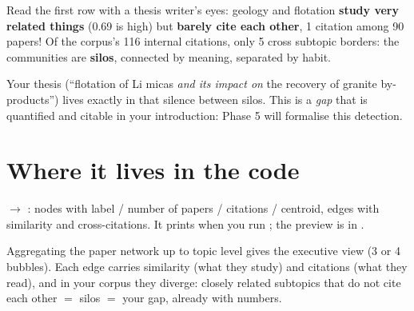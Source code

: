\documentclass[11pt,a4paper]{article}
\begin{document}
\begin{ojo}
Read the first row with a thesis writer's eyes: geology and flotation \textbf{study very
related things} (0.69 is high) but \textbf{barely cite each other}, 1 citation among 90
papers! Of the corpus's 116 internal citations, only 5 cross subtopic borders: the communities
are \textbf{silos}, connected by meaning, separated by habit.

Your thesis (``flotation of Li micas \emph{and its impact on} the recovery of granite
by-products'') lives exactly in that silence between silos. This is a \emph{gap} that is
quantified and citable in your introduction: Phase 5 will formalise this detection.
\end{ojo}

\section{Where it lives in the code}

 $\rightarrow$ : nodes with
label / number of papers / citations / centroid, edges with similarity and cross-citations. It
prints when you run ; the preview is in
.

\begin{resumen}
Aggregating the paper network up to topic level gives the executive view (3 or 4 bubbles).
Each edge carries similarity (what they study) and citations (what they read), and in your
corpus they diverge: closely related subtopics that do not cite each other $=$ silos $=$ your
gap, already with numbers.
\end{resumen}
\end{document}
